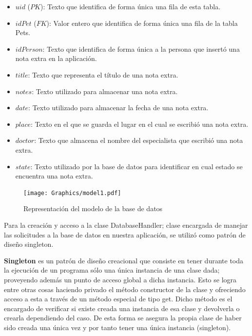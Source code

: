 \begin{itemize}
\item	$uid$ ($PK$): Texto que identifica de forma única una fila de esta tabla.
\item	$idPet$ ($FK$): Valor entero que identifica de forma única una fila de la tabla Pets.
\item	$idPerson$: Texto que identifica de forma única a la persona que insertó una nota extra en la aplicación.
\item	$title$: Texto que representa el título de una nota extra.
\item	$notes$: Texto utilizado para almacenar una nota extra.
\item	$date$: Texto utilizado para almacenar la fecha de una nota extra.
\item	$place$: Texto en el que se guarda el lugar en el cual se escribió una nota extra.
\item	$doctor$: Texto que almacena el nombre del especialista que escribió una nota extra.
\item	$state$: Texto utilizado por la base de datos para identificar en cual estado se encuentra una nota extra.
\end{itemize}



\begin{figure}[h!]
\begin{center}
\texttt{[image: Graphics/model1.pdf]}
\caption{Representación del modelo de la base de datos}
\label{fig:rcm}

\end{center}
\end{figure}




Para la creación y acceso a la clase DatabaseHandler; clase encargada de manejar las solicitudes a la base de datos en nuestra aplicación, se utilizó como patrón de diseño singleton. 

\textbf{Singleton}  es un patrón de diseño creacional que consiste en tener durante toda la ejecución de un programa sólo una única instancia de una clase dada; proveyendo además un punto de acceso global a dicha instancia. Esto se logra entre otras cosas haciendo privado el método constructor de la clase y ofreciendo acceso a esta a través de un método especial de tipo get. Dicho método es el encargado de verificar si existe creada una instancia de esa clase y devolverla o crearla dependiendo del caso. De esta forma se asegura la propia clase de haber sido creada una única vez y por tanto tener una única instancia (singleton).



